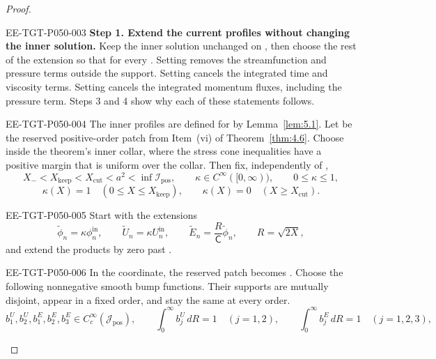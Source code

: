\begin{proof}
\begin{EESegment}{EE-TGT-P050-003}
\textbf{Step 1. Extend the current profiles without changing the inner solution.}
Keep the inner solution unchanged on , then choose the rest of the extension so that
 for every . Setting
 removes the streamfunction and pressure terms outside the support. Setting
 cancels the integrated time and viscosity terms. Setting
 cancels the integrated momentum fluxes, including the pressure term.
Steps 3 and 4 show why each of these statements follows.
\end{EESegment}

\begin{EESegment}{EE-TGT-P050-004}
The inner profiles
 are defined for
 by Lemma~\ref{lem:5.1}. Let
 be the reserved positive-order patch from Item~\textup{(vi)} of
Theorem~\ref{thm:4.6}. Choose  inside the theorem's inner collar, where the stress cone
inequalities have a positive margin that is uniform over the collar. Then fix, independently of
,
\[
X_-<X_{\mathrm{keep}}<X_{\mathrm{cut}}<a^2<\inf\mathcal I_{\mathrm{pos}},
\qquad
\kappa\in C^\infty([0,\infty)),
\qquad
0\leq\kappa\leq1,
\]
\[
\kappa(X)=1\quad(0\leq X\leq X_{\mathrm{keep}}),
\qquad
\kappa(X)=0\quad(X\geq X_{\mathrm{cut}}).
\]
\end{EESegment}

\begin{EESegment}{EE-TGT-P050-005}
Start with the extensions
\[
\widetilde\phi_n=\kappa\phi_n^{\mathrm{in}},
\qquad
\widetilde U_n=\kappa U_n^{\mathrm{in}},
\qquad
\widetilde E_n=\frac{R}{\mathsf C}\widetilde\phi_n,
\qquad
R=\sqrt{2X},
\]
and extend the products by zero past .
\end{EESegment}

\begin{EESegment}{EE-TGT-P050-006}
In the  coordinate, the reserved patch  becomes
. Choose the following
nonnegative smooth bump functions. Their supports are mutually disjoint, appear in a fixed order, and stay the same at
every order.
\[
b_1^U,b_2^U,b_1^E,b_2^E,b_3^E\in C_c^\infty(\mathcal J_{\mathrm{pos}}),
\qquad
\int_0^\infty b_j^U\,dR=1\quad(j=1,2),
\qquad
\int_0^\infty b_j^E\,dR=1\quad(j=1,2,3),
\]
\end{EESegment}


\end{proof}
